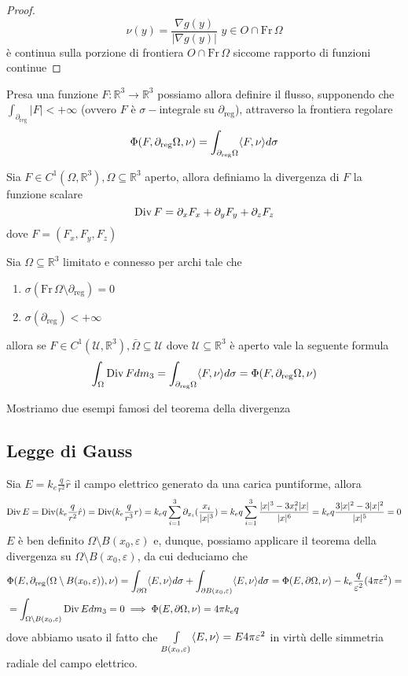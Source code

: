 \begin{proof}
$$
\nu(y) = \frac{\nabla g(y)}{|\nabla g(y)|} \, \, y \in O \cap \text{Fr} \, \Omega
$$
è continua sulla porzione di frontiera $O \cap \text{Fr} \, \Omega$ siccome rapporto di funzioni continue
\end{proof}
Presa una funzione $F: \mathbb{R}^3 \to \mathbb{R}^3$ possiamo allora definire il flusso, supponendo che $\int_{\partial_{\text{reg}}} |F| < +\infty$ (ovvero $F$ è $\sigma-$integrale su $\partial_{\text{reg}}$), attraverso la frontiera regolare
$$
\Phi(F, \partial_{\text{reg}} \Omega, \nu) = \int_{\partial_{\text{reg}} \Omega} \langle F, \nu \rangle d \sigma
$$
\begin{definition}[divergenza]
	Sia $F \in C^1(\Omega, \mathbb{R}^3), \Omega \subseteq \mathbb{R}^3$ aperto, allora definiamo la divergenza di $F$ la funzione scalare
	$$
	\operatorname{Div} F = \partial_x F_x + \partial_y F_y + \partial_z F_z
	$$
	dove $F=(F_x, F_y, F_z)$
\end{definition}
\begin{theorem}
	Sia $\Omega \subseteq \mathbb{R}^3$ limitato e connesso per archi tale che
	\begin{enumerate}[label=\protect\circled{\arabic*}]
		\item $\sigma(\text{Fr} \, \Omega \setminus \partial_{\text{reg}}) = 0$
		\item $\sigma(\partial_{\text{reg}}) < +\infty$
	\end{enumerate}
	allora se $F \in C^1(\mathcal{U}, \mathbb{R}^3), \bar{\Omega} \subseteq \mathcal{U}$ dove $\mathcal{U} \subseteq \mathbb{R}^3$ è aperto vale la seguente formula
	$$
	\int_\Omega \operatorname{Div} F dm_3 = \int_{\partial_{\text{reg}} \Omega} \langle F, \nu \rangle d\sigma = \Phi(F, \partial_{\text{reg}} \Omega, \nu)
	$$
\end{theorem}
Mostriamo due esempi famosi del teorema della divergenza
\subsection{Legge di Gauss}
Sia $E = k_e \frac{q}{r^2}\hat{r}$ il campo elettrico generato da una carica puntiforme, allora
$$
\operatorname{Div} E = \operatorname{Div}(k_e \frac{q}{r^2} \hat{r}) = \operatorname{Div}(k_e \frac{q}{r^3}r) = k_e q \sum_{i=1}^3 \partial_{x_i} (\frac{x_i}{|x|^3}) = k_e q \sum_{i=1}^3 \frac{|x|^3 - 3 x_i^2 |x|}{|x|^6} = k_e q \frac{3|x|^2 - 3 |x|^2}{|x|^5} = 0
$$ 
$E$ è ben definito $\Omega \setminus B(x_0, \varepsilon)$ e, dunque, possiamo applicare il teorema della divergenza su $\Omega \setminus B(x_0, \varepsilon)$, da cui deduciamo che
\begin{align*}
&\Phi(E, \partial_{\text{reg}} (\Omega \setminus B(x_0, \varepsilon)), \nu) = \int_{\partial \Omega} \langle E, \nu \rangle d\sigma + \int_{\partial B(x_0, \varepsilon)} \langle E, \nu \rangle d\sigma = \Phi(E, \partial \Omega, \nu) - k_e \frac{q}{\varepsilon^2} (4 \pi \varepsilon^2) = \\
&=\int_{\Omega \setminus B(x_0, \varepsilon)} \operatorname{Div} E dm_3 = 0 \implies \Phi(E, \partial \Omega, \nu) = 4 \pi k_e q
\end{align*}
dove abbiamo usato il fatto che $\int\limits_{B(x_0, \varepsilon)} \langle E, \nu \rangle = E 4 \pi \varepsilon^2$ in virtù delle simmetria radiale del campo elettrico.
